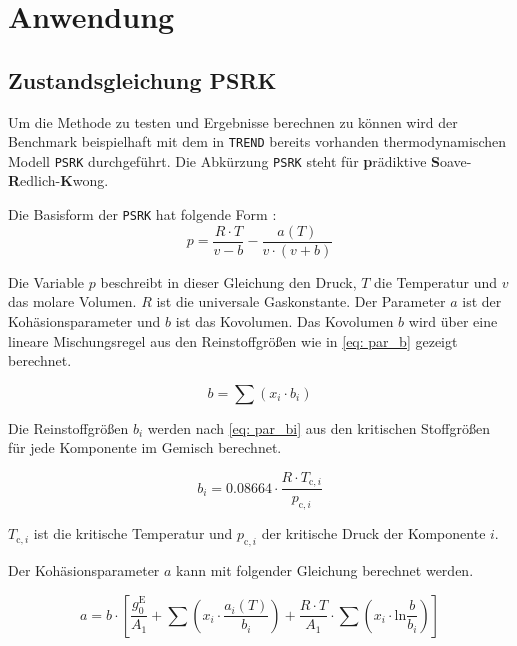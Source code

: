 \documentclass[../thesis.tex]{subfiles}
\begin{document}
\chapter{Anwendung}

\section{Zustandsgleichung PSRK}

Um die Methode zu testen und Ergebnisse berechnen zu können wird der Benchmark beispielhaft mit dem in \texttt{TREND} bereits vorhanden thermodynamischen Modell \texttt{PSRK} durchgeführt. Die Abkürzung \texttt{PSRK} steht für \textbf{p}rädiktive \textbf{S}oave-\textbf{R}edlich-\textbf{K}wong.

Die Basisform der \texttt{PSRK} hat folgende Form \cite{HOLDERBAUM1991251}:
\begin{equation}
	p = \dfrac{R \cdot T}{v - b}- \dfrac{a(T)}{v \cdot (v + b)}
\end{equation}

Die Variable $ p $ beschreibt in dieser Gleichung den Druck, $ T $ die Temperatur und $ v $ das molare Volumen. $ R $ ist die universale Gaskonstante. Der Parameter $a$ ist der Kohäsionsparameter und $ b $ ist das Kovolumen. Das Kovolumen $ b $ wird über eine lineare Mischungsregel aus den Reinstoffgrößen wie in \autoref{eq: par_b} gezeigt berechnet.

\begin{equation}
	b = \sum \left( x_i \cdot b_i \right)
	\label{eq: par_b}
\end{equation}

Die Reinstoffgrößen $ b_i $ werden nach \autoref{eq: par_bi} aus den kritischen Stoffgrößen für jede Komponente im Gemisch berechnet.

\begin{equation}
	b_i = 0\text{.}08664 \cdot \dfrac{R \cdot T_{\mathrm{c},i}}{p_{\mathrm{c},i}}
	\label{eq: par_bi}
\end{equation}

$ T_{\mathrm{c},i} $ ist die kritische Temperatur und $ p_{\mathrm{c},i} $ der kritische Druck der Komponente $ i$.

Der Kohäsionsparameter $a$ kann mit folgender Gleichung berechnet werden.

\begin{equation}
	a = b \cdot \left[ \dfrac{g^{\mathrm{E}}_0}{A_1} + \sum \left( x_i \cdot \dfrac{a_i(T)}{b_i} \right) + \dfrac{R \cdot T}{A_1} \cdot \sum \left( x_i \cdot \mathrm{ln}\dfrac{b}{b_i} \right) \right]
\end{equation} 
\end{document}
